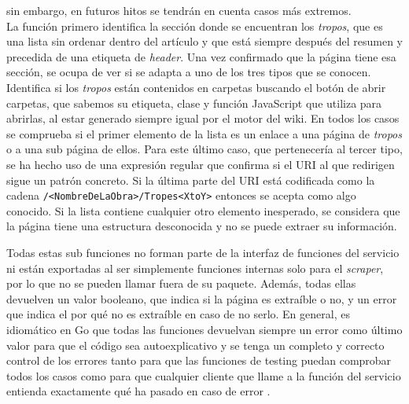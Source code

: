 \begin{itemize}
    sin embargo, en futuros hitos se tendrán en cuenta casos más extremos.\\
    La función primero identifica la sección donde se encuentran los
    \textit{tropos}, que es una lista sin ordenar dentro del artículo y que está
    siempre después del resumen y precedida de una etiqueta de \textit{header}.
    Una vez confirmado que la página tiene esa sección, se ocupa de ver si se
    adapta a uno de los tres tipos que se conocen. Identifica si los
    \textit{tropos} están contenidos en carpetas buscando el botón de abrir
    carpetas, que sabemos su etiqueta, clase y función JavaScript que utiliza
    para abrirlas, al estar generado siempre igual por el motor del wiki. En
    todos los casos se comprueba si el primer elemento de la lista es un enlace
    a una página de \textit{tropos} o a una sub página de ellos. Para este
    último caso, que pertenecería al tercer tipo, se ha hecho uso de una
    expresión regular que confirma si el URI al que redirigen sigue un patrón
    concreto. Si la última parte del URI está codificada como la cadena
    \texttt{/<NombreDeLaObra>/Tropes<XtoY>} entonces se acepta como algo
    conocido. Si la lista contiene cualquier otro elemento inesperado, se
    considera que la página tiene una estructura desconocida y no se puede
    extraer su información.
\end{itemize}

Todas estas sub funciones no forman parte de la interfaz de funciones del servicio
ni están exportadas al ser simplemente funciones internas solo para el
\textit{scraper}, por lo que no se pueden llamar fuera de su paquete. Además,
todas ellas devuelven un valor booleano, que indica si la página es extraíble o
no, y un error que indica el por qué no es extraíble en caso de no serlo. En
general, es idiomático en Go que todas las funciones devuelvan siempre un error
como último valor para que el código sea autoexplicativo y se tenga un completo
y correcto control de los errores tanto para que las funciones de testing puedan
comprobar todos los casos como para que cualquier cliente que llame a la función
del servicio entienda exactamente qué ha pasado en caso de error
\cite{effective_go}.

